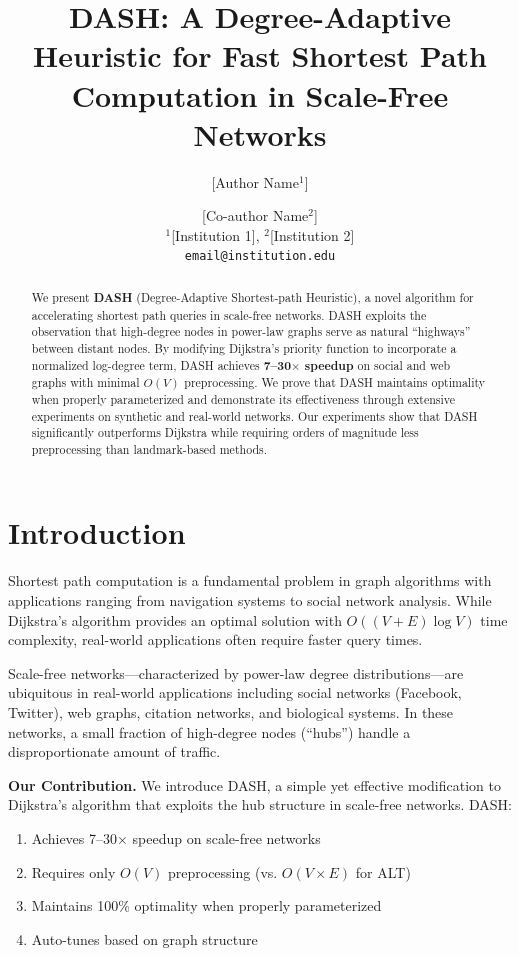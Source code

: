 \documentclass[11pt,a4paper]{article}
\title{DASH: A Degree-Adaptive Heuristic for Fast Shortest Path\\
Computation in Scale-Free Networks}
\author{
  [Author Name$^1$] \and [Co-author Name$^2$]\\
  $^1$[Institution 1], $^2$[Institution 2]\\
  \texttt{email@institution.edu}
}
\date{}
\begin{document}
\maketitle

\begin{abstract}
We present \textbf{DASH} (Degree-Adaptive Shortest-path Heuristic), a novel 
algorithm for accelerating shortest path queries in scale-free networks. 
DASH exploits the observation that high-degree nodes in power-law graphs 
serve as natural ``highways'' between distant nodes. By modifying Dijkstra's 
priority function to incorporate a normalized log-degree term, DASH achieves 
\textbf{7--30$\times$ speedup} on social and web graphs with minimal $O(V)$ 
preprocessing. We prove that DASH maintains optimality when properly 
parameterized and demonstrate its effectiveness through extensive experiments 
on synthetic and real-world networks. Our experiments show that DASH 
significantly outperforms Dijkstra while requiring orders of magnitude less 
preprocessing than landmark-based methods.
\end{abstract}

\section{Introduction}

Shortest path computation is a fundamental problem in graph algorithms with 
applications ranging from navigation systems to social network analysis. 
While Dijkstra's algorithm provides an optimal solution with 
$O((V + E) \log V)$ time complexity, real-world applications often require 
faster query times.

Scale-free networks---characterized by power-law degree distributions---are 
ubiquitous in real-world applications including social networks (Facebook, 
Twitter), web graphs, citation networks, and biological systems. In these 
networks, a small fraction of high-degree nodes (``hubs'') handle a 
disproportionate amount of traffic.

\textbf{Our Contribution.} We introduce DASH, a simple yet effective 
modification to Dijkstra's algorithm that exploits the hub structure in 
scale-free networks. DASH:

\begin{enumerate}
    \item Achieves 7--30$\times$ speedup on scale-free networks
    \item Requires only $O(V)$ preprocessing (vs. $O(V \times E)$ for ALT)
    \item Maintains 100\% optimality when properly parameterized
    \item Auto-tunes based on graph structure
\end{enumerate}
\end{document}
